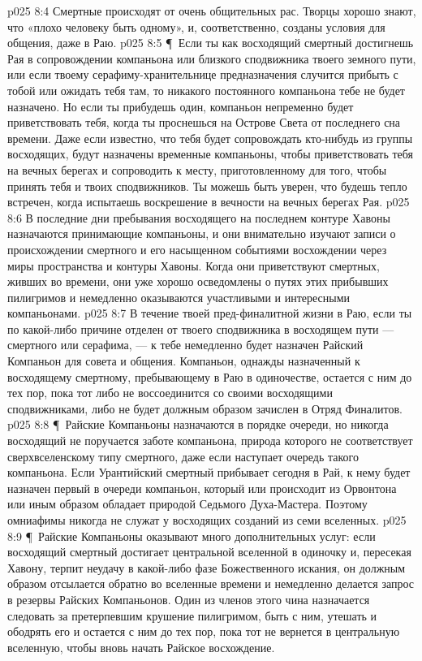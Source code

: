 \vs p025 8:4 Смертные происходят от очень общительных рас. Творцы хорошо знают, что «плохо человеку быть одному», и, соответственно, созданы условия для общения, даже в Раю.
\vs p025 8:5 \P\ Если ты как восходящий смертный достигнешь Рая в сопровождении компаньона или близкого сподвижника твоего земного пути, или если твоему серафиму\hyp{}хранительнице предназначения случится прибыть с тобой или ожидать тебя там, то никакого постоянного компаньона тебе не будет назначено. Но если ты прибудешь один, компаньон непременно будет приветствовать тебя, когда ты проснешься на Острове Света от последнего сна времени. Даже если известно, что тебя будет сопровождать кто\hyp{}нибудь из группы восходящих, будут назначены временные компаньоны, чтобы приветствовать тебя на вечных берегах и сопроводить к месту, приготовленному для того, чтобы принять тебя и твоих сподвижников. Ты можешь быть уверен, что будешь тепло встречен, когда испытаешь воскрешение в вечности на вечных берегах Рая.
\vs p025 8:6 В последние дни пребывания восходящего на последнем контуре Хавоны назначаются принимающие компаньоны, и они внимательно изучают записи о происхождении смертного и его насыщенном событиями восхождении через миры пространства и контуры Хавоны. Когда они приветствуют смертных, живших во времени, они уже хорошо осведомлены о путях этих прибывших пилигримов и немедленно оказываются участливыми и интересными компаньонами.
\vs p025 8:7 В течение твоей пред\hyp{}финалитной жизни в Раю, если ты по какой\hyp{}либо причине отделен от твоего сподвижника в восходящем пути --- смертного или серафима, --- к тебе немедленно будет назначен Райский Компаньон для совета и общения. Компаньон, однажды назначенный к восходящему смертному, пребывающему в Раю в одиночестве, остается с ним до тех пор, пока тот либо не воссоединится со своими восходящими сподвижниками, либо не будет должным образом зачислен в Отряд Финалитов.
\vs p025 8:8 \P\ Райские Компаньоны назначаются в порядке очереди, но никогда восходящий не поручается заботе компаньона, природа которого не соответствует сверхвселенскому типу смертного, даже если наступает очередь такого компаньона. Если Урантийский смертный прибывает сегодня в Рай, к нему будет назначен первый в очереди компаньон, который или происходит из Орвонтона или иным образом обладает природой Седьмого Духа\hyp{}Мастера. Поэтому омниафимы никогда не служат у восходящих созданий из семи вселенных.
\vs p025 8:9 \P\ Райские Компаньоны оказывают много дополнительных услуг: если восходящий смертный достигает центральной вселенной в одиночку и, пересекая Хавону, терпит неудачу в какой\hyp{}либо фазе Божественного искания, он должным образом отсылается обратно во вселенные времени и немедленно делается запрос в резервы Райских Компаньонов. Один из членов этого чина назначается следовать за претерпевшим крушение пилигримом, быть с ним, утешать и ободрять его и остается с ним до тех пор, пока тот не вернется в центральную вселенную, чтобы вновь начать Райское восхождение.
